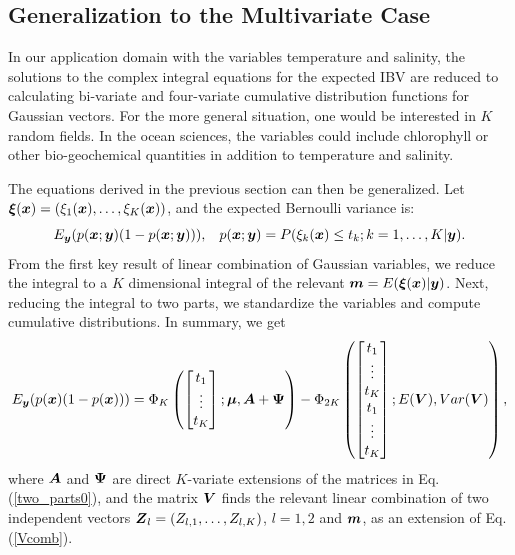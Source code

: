 \documentclass[aoas]{imsart}
\begin{document}
\subsection{Generalization to the Multivariate Case}
\label{gen_k}

In our application domain with the variables temperature and salinity,
the solutions to the complex integral equations for the expected IBV
are reduced to calculating bi-variate and four-variate cumulative
distribution functions for Gaussian vectors. For the more general
situation, one would be interested in $K$ random fields. In the
ocean sciences, the variables could include chlorophyll or other
bio-geochemical quantities in addition to temperature and salinity.

The equations derived in the previous section can then be generalized. Let
${\boldsymbol \xi}({\boldsymbol x})=(\xi_1({\boldsymbol x}),\ldots,\xi_K({\boldsymbol x}))$, and the expected Bernoulli
variance is:
\begin{equation}\label{two_partsK}
E_{\by}(p(\bx;\by)(1-p(\bx;\by))), \hspace{3mm} p(\bx;\by)=P(\xi_k(\bx) \leq t_k ; k=1,\ldots,K|\by). 
\end{equation}
From the first key result of linear combination of Gaussian variables,
we reduce the integral to a $K$ dimensional integral of the relevant
${\boldsymbol m}=E({\boldsymbol \xi}({\boldsymbol x})|{\boldsymbol y})$. Next, reducing the integral to two parts, we
standardize the variables and compute cumulative distributions.  In
summary, we get
\begin{equation}\label{two_parts}
E_{\by}(p(\bx)(1-p(\bx))) =  \Phi_K 
\begin{pmatrix}
\begin{bmatrix} t_1\\
\vdots \\
t_K 
\end{bmatrix};
\bmu,\bA+\bPsi 
\end{pmatrix}
- \Phi_{2K} 
\begin{pmatrix}
\begin{bmatrix} t_1\\
\vdots \\
t_K \\
t_1\\
\vdots \\
t_K 
\end{bmatrix};
E(\bV),Var(\bV) 
\end{pmatrix},\nonumber
\end{equation}
where ${\boldsymbol A}$ and ${\boldsymbol \Psi}$ are direct $K$-variate extensions of the
matrices in Eq. (\ref{two_parts0}), and the matrix ${\boldsymbol V}$ finds the
relevant linear combination of two independent vectors
${\boldsymbol Z}_l=(Z_{l,1},\ldots,Z_{l,K})$, $l=1,2$ and ${\boldsymbol m}$, as an extension
of Eq. (\ref{Vcomb}).
\end{document}
